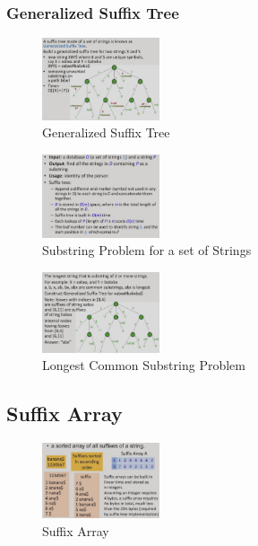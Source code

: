 \subsubsection{Generalized Suffix Tree}

\begin{figure}[H]
    \centering
    \includegraphics[width=0.309\textwidth]{pic/DAA7/Generalized Suffix Tree}
    \caption{Generalized Suffix Tree}
\end{figure}

\begin{figure}[H]
    \centering
    \includegraphics[width=0.309\textwidth]{pic/DAA7/Substring Problem for a set of Strings}
    \caption{Substring Problem for a set of Strings}
\end{figure}


\begin{figure}[H]
    \centering
    \includegraphics[width=0.309\textwidth]{pic/DAA7/Longest Common Substring Problem}
    \caption{Longest Common Substring Problem}
\end{figure}

\subsection{Suffix Array}
\begin{figure}[H]
    \centering
    \includegraphics[width=0.309\textwidth]{pic/DAA7/Suffix Array}
    \caption{Suffix Array}
\end{figure}



